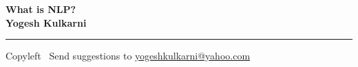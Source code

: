 
\graphicspath{{images/}}

\footnotesize


\begin{center}
\Large{\textbf{What is NLP?\\ Yogesh Kulkarni}}  
\end{center}

\begin{multicols}{2}

\end{multicols}

\rule{\linewidth}{0.25pt}
\scriptsize
Copyleft \textcopyleft\  Send suggestions to 
\href{http://www.yogeshkulkarni.com}{yogeshkulkarni@yahoo.com}


